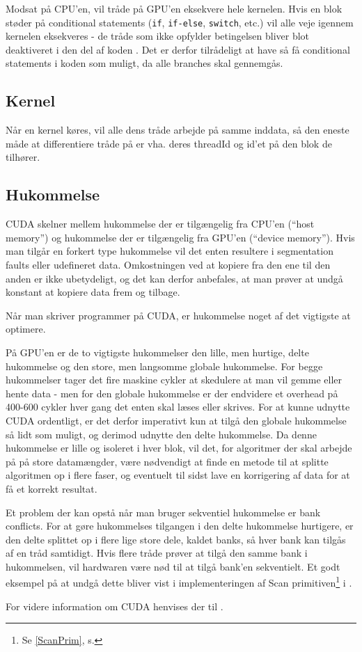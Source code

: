 Modsat på CPU'en, vil tråde på GPU'en eksekvere hele kernelen. Hvis en blok støder på conditional statements (\texttt{if}, \texttt{if-else}, \texttt{switch}, etc.) vil alle veje igennem kernelen eksekveres - de tråde som ikke opfylder betingelsen bliver blot deaktiveret i den del af koden \cite{cuda-guide}. Det er derfor tilrådeligt at have så få conditional statements i koden som muligt, da alle branches skal gennemgås.

\subsection{Kernel}
Når en kernel køres, vil alle dens tråde arbejde på samme inddata, så den eneste måde at differentiere tråde på er vha. deres threadId og id'et på den blok de tilhører.

\subsection{Hukommelse}
\label{CudaHukom}
CUDA skelner mellem hukommelse der er tilgængelig fra CPU'en (``host memory'') og hukommelse der er tilgængelig fra GPU'en (``device memory''). Hvis man tilgår en forkert type hukommelse vil det enten resultere i segmentation faults eller udefineret data. Omkostningen ved at kopiere fra den ene til den anden er ikke ubetydeligt, og det kan derfor anbefales, at man prøver at undgå konstant at kopiere data frem og tilbage.

Når man skriver programmer på CUDA, er hukommelse noget af det vigtigste at optimere.

På GPU'en er de to vigtigste hukommelser den lille, men hurtige, delte hukommelse og den store, men langsomme globale hukommelse. For begge hukommelser tager det fire maskine cykler at skedulere at man vil gemme eller hente data - men for den globale hukommelse er der endvidere et overhead på 400-600 cykler hver gang det enten skal læses eller skrives. For at kunne udnytte CUDA ordentligt, er det derfor imperativt kun at tilgå den globale hukommelse så lidt som muligt, og derimod udnytte den delte hukommelse. Da denne hukommelse er lille og isoleret i hver blok, vil det, for algoritmer der skal arbejde på på store datamængder, være nødvendigt at finde en metode til at splitte algoritmen op i flere faser, og eventuelt til sidst lave en korrigering af data for at få et korrekt resultat.

Et problem der kan opstå når man bruger sekventiel hukommelse er bank conflicts. For at gøre hukommelses tilgangen i den delte hukommelse hurtigere, er den delte splittet op i flere lige store dele, kaldet banks, så hver bank kan tilgås af en tråd samtidigt. Hvis flere tråde prøver at tilgå den samme bank i hukommelsen, vil hardwaren være nød til at tilgå bank'en sekventielt. Et godt eksempel på at undgå dette bliver vist i implementeringen af Scan primitiven\footnote{Se \ref{ScanPrim}, s. \pageref{ScanPrim}} i \cite{gpu-scan}.

For videre information om CUDA henvises der til \cite{cuda-guide}.
